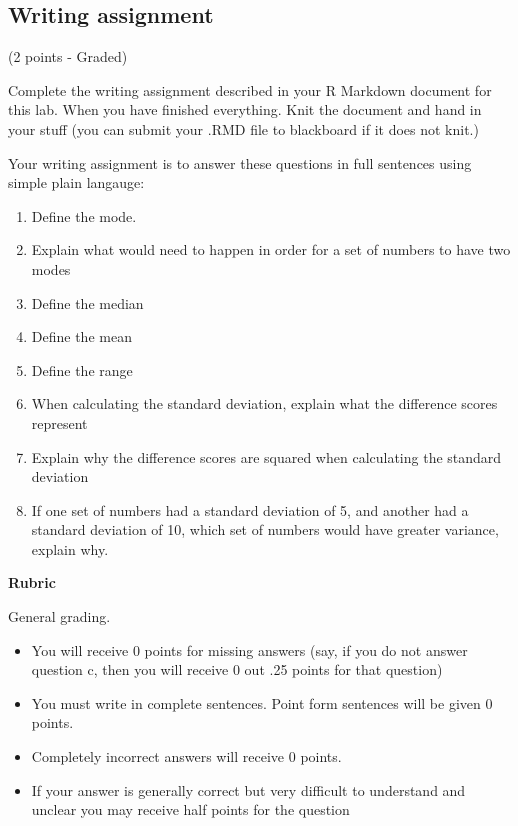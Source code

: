 \documentclass[
]{book}
\providecommand{\tightlist}{%
  \setlength{\itemsep}{0pt}\setlength{\parskip}{0pt}}
\begin{document}
\hypertarget{writing-assignment-1}{%
\subsection{Writing assignment}\label{writing-assignment-1}}

(2 points - Graded)

Complete the writing assignment described in your R Markdown document for this lab. When you have finished everything. Knit the document and hand in your stuff (you can submit your .RMD file to blackboard if it does not knit.)

Your writing assignment is to answer these questions in full sentences using simple plain langauge:

\begin{enumerate}
\def\labelenumi{\arabic{enumi}.}
\tightlist
\item
  Define the mode.
\item
  Explain what would need to happen in order for a set of numbers to have two modes
\item
  Define the median
\item
  Define the mean
\item
  Define the range
\item
  When calculating the standard deviation, explain what the difference scores represent
\item
  Explain why the difference scores are squared when calculating the standard deviation
\item
  If one set of numbers had a standard deviation of 5, and another had a standard deviation of 10, which set of numbers would have greater variance, explain why.
\end{enumerate}

\textbf{Rubric}

General grading.

\begin{itemize}
\tightlist
\item
  You will receive 0 points for missing answers (say, if you do not answer question c, then you will receive 0 out .25 points for that question)
\item
  You must write in complete sentences. Point form sentences will be given 0 points.
\item
  Completely incorrect answers will receive 0 points.
\item
  If your answer is generally correct but very difficult to understand and unclear you may receive half points for the question
\end{itemize}
\end{document}
